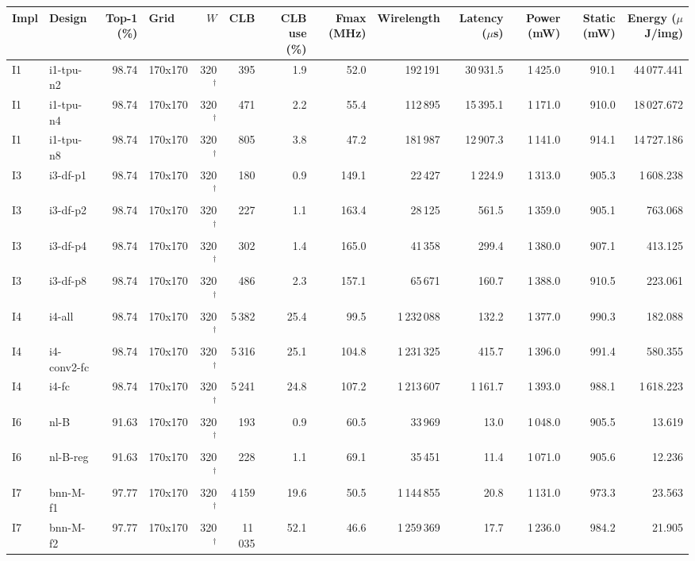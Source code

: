 \begin{table}[t]
\centering
\small
\begin{tabular}{llrlrrrrrrrrr}
\toprule
Impl & Design & Top-1 (\%) & Grid & $W$ & CLB & CLB use (\%) & Fmax (MHz) & Wirelength & Latency ($\mu$s) & Power (mW) & Static (mW) & Energy ($\mu$J/img) \\
\midrule
I1 & i1-tpu-n2 & 98.74 & 170x170 & 320$^\dagger$ & 395 & 1.9 & 52.0 & 192\,191 & 30\,931.5 & 1\,425.0 & 910.1 & 44\,077.441 \\
I1 & i1-tpu-n4 & 98.74 & 170x170 & 320$^\dagger$ & 471 & 2.2 & 55.4 & 112\,895 & 15\,395.1 & 1\,171.0 & 910.0 & 18\,027.672 \\
I1 & i1-tpu-n8 & 98.74 & 170x170 & 320$^\dagger$ & 805 & 3.8 & 47.2 & 181\,987 & 12\,907.3 & 1\,141.0 & 914.1 & 14\,727.186 \\
\midrule
I3 & i3-df-p1 & 98.74 & 170x170 & 320$^\dagger$ & 180 & 0.9 & 149.1 & 22\,427 & 1\,224.9 & 1\,313.0 & 905.3 & 1\,608.238 \\
I3 & i3-df-p2 & 98.74 & 170x170 & 320$^\dagger$ & 227 & 1.1 & 163.4 & 28\,125 & 561.5 & 1\,359.0 & 905.1 & 763.068 \\
I3 & i3-df-p4 & 98.74 & 170x170 & 320$^\dagger$ & 302 & 1.4 & 165.0 & 41\,358 & 299.4 & 1\,380.0 & 907.1 & 413.125 \\
I3 & i3-df-p8 & 98.74 & 170x170 & 320$^\dagger$ & 486 & 2.3 & 157.1 & 65\,671 & 160.7 & 1\,388.0 & 910.5 & 223.061 \\
\midrule
I4 & i4-all & 98.74 & 170x170 & 320$^\dagger$ & 5\,382 & 25.4 & 99.5 & 1\,232\,088 & 132.2 & 1\,377.0 & 990.3 & 182.088 \\
I4 & i4-conv2-fc & 98.74 & 170x170 & 320$^\dagger$ & 5\,316 & 25.1 & 104.8 & 1\,231\,325 & 415.7 & 1\,396.0 & 991.4 & 580.355 \\
I4 & i4-fc & 98.74 & 170x170 & 320$^\dagger$ & 5\,241 & 24.8 & 107.2 & 1\,213\,607 & 1\,161.7 & 1\,393.0 & 988.1 & 1\,618.223 \\
\midrule
I6 & nl-B & 91.63 & 170x170 & 320$^\dagger$ & 193 & 0.9 & 60.5 & 33\,969 & 13.0 & 1\,048.0 & 905.5 & 13.619 \\
I6 & nl-B-reg & 91.63 & 170x170 & 320$^\dagger$ & 228 & 1.1 & 69.1 & 35\,451 & 11.4 & 1\,071.0 & 905.6 & 12.236 \\
\midrule
I7 & bnn-M-f1 & 97.77 & 170x170 & 320$^\dagger$ & 4\,159 & 19.6 & 50.5 & 1\,144\,855 & 20.8 & 1\,131.0 & 973.3 & 23.563 \\
I7 & bnn-M-f2 & 97.77 & 170x170 & 320$^\dagger$ & 11\,035 & 52.1 & 46.6 & 1\,259\,369 & 17.7 & 1\,236.0 & 984.2 & 21.905 \\

\end{tabular}
\end{table}
